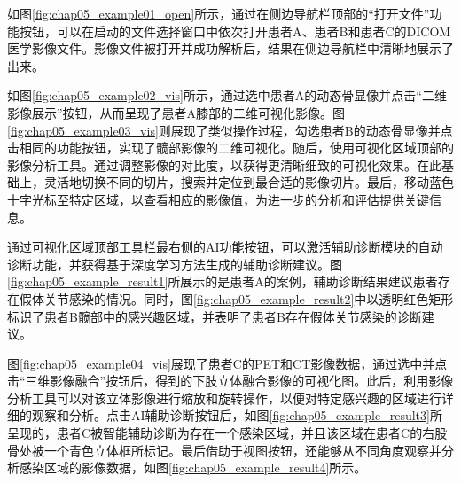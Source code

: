 如图\ref{fig:chap05_example01_open}所示，通过在侧边导航栏顶部的“打开文件”功能按钮，可以在启动的文件选择窗口中依次打开患者A、患者B和患者C的DICOM医学影像文件。影像文件被打开并成功解析后，结果在侧边导航栏中清晰地展示了出来。

如图\ref{fig:chap05_example02_vis}所示，通过选中患者A的动态骨显像并点击“二维影像展示”按钮，从而呈现了患者A膝部的二维可视化影像。图\ref{fig:chap05_example03_vis}则展现了类似操作过程，勾选患者B的动态骨显像并点击相同的功能按钮，实现了髋部影像的二维可视化。随后，使用可视化区域顶部的影像分析工具。通过调整影像的对比度，以获得更清晰细致的可视化效果。在此基础上，灵活地切换不同的切片，搜索并定位到最合适的影像切片。最后，移动蓝色十字光标至特定区域，以查看相应的影像值，为进一步的分析和评估提供关键信息。

通过可视化区域顶部工具栏最右侧的AI功能按钮，可以激活辅助诊断模块的自动诊断功能，并获得基于深度学习方法生成的辅助诊断建议。图\ref{fig:chap05_example_result1}所展示的是患者A的案例，辅助诊断结果建议患者存在假体关节感染的情况。同时，图\ref{fig:chap05_example_result2}中以透明红色矩形标识了患者B髋部中的感兴趣区域，并表明了患者B存在假体关节感染的诊断建议。

图\ref{fig:chap05_example04_vis}展现了患者C的PET和CT影像数据，通过选中并点击“三维影像融合”按钮后，得到的下肢立体融合影像的可视化图。此后，利用影像分析工具可以对该立体影像进行缩放和旋转操作，以便对特定感兴趣的区域进行详细的观察和分析。点击AI辅助诊断按钮后，如图\ref{fig:chap05_example_result3}所呈现的，患者C被智能辅助诊断为存在一个感染区域，并且该区域在患者C的右股骨处被一个青色立体框所标记。最后借助于视图按钮，还能够从不同角度观察并分析感染区域的影像数据，如图\ref{fig:chap05_example_result4}所示。

